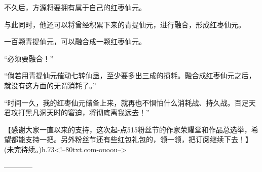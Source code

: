 \begin{this_body}
不久后，方源将要拥有属于自己的红枣仙元。

与此同时，他还可以将曾经积累下来的青提仙元，进行融合，形成红枣仙元。

一百颗青提仙元，可以融合成一颗红枣仙元。

“必须要融合！”

“倘若用青提仙元催动七转仙蛊，至少要多出三成的损耗。融合成红枣仙元之后，就没有这方面的无谓消耗了。”

“时间一久，我的红枣仙元储备上来，就再也不惧怕什么消耗战、持久战。百足天君攻打黑凡洞天时的窘迫，将彻底离我远去！”

【感谢大家一直以来的支持，这次起-点515粉丝节的作家荣耀堂和作品总选举，希望都能支持一把。另外粉丝节还有些红包礼包的，领一领，把订阅继续下去！】(未完待续。)h.73<!--80txt.com-ouoou-->

------------

\end{this_body}

